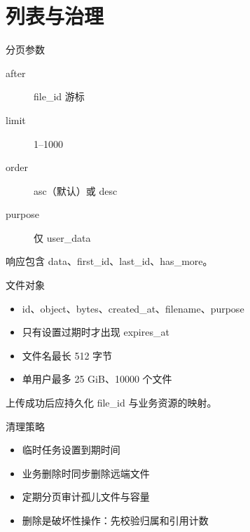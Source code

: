 \documentclass[aspectratio=169,UTF8]{ctexbeamer}
\begin{document}
\section{列表与治理}
\begin{frame}{分页参数}
\begin{description}
  \item[after] file\_id 游标
  \item[limit] 1--1000
  \item[order] asc（默认）或 desc
  \item[purpose] 仅 user\_data
\end{description}
响应包含 data、first\_id、last\_id、has\_more。
\end{frame}
\begin{frame}{文件对象}
\begin{itemize}
  \item id、object、bytes、created\_at、filename、purpose
  \item 只有设置过期时才出现 expires\_at
  \item 文件名最长 512 字节
  \item 单用户最多 25 GiB、10000 个文件
\end{itemize}
上传成功后应持久化 file\_id 与业务资源的映射。
\end{frame}
\begin{frame}{清理策略}
\begin{itemize}
  \item 临时任务设置到期时间
  \item 业务删除时同步删除远端文件
  \item 定期分页审计孤儿文件与容量
  \item 删除是破坏性操作：先校验归属和引用计数
\end{itemize}
\end{frame}
\end{document}
